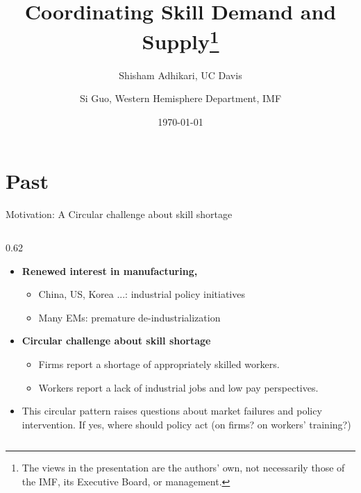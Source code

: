 \documentclass[9pt,xcolor={svgnames}]{beamer}
\title[Bridging the Manufacturing Gap]{\large \textbf{Coordinating Skill Demand and Supply\footnote{The views in the presentation are the authors' own, not necessarily those of the IMF, its Executive Board, or management.}\\ %
}
}
\author{Shisham Adhikari, UC Davis \\  %
\vspace{3mm}
\and Si Guo, Western Hemisphere Department,  IMF}    %
\date[Davis]{%
  \today
}
\begin{document}
\begin{frame}
\titlepage %
\end{frame}



\section{Past} 
\begin{frame}{Motivation: A Circular challenge about skill shortage}\label{main:intro}

\setlength{\columnsep}{8pt}

\begin{columns}[T,onlytextwidth]
\begin{column}{0.62\textwidth}
 \begin{itemize}

  \item \textbf{Renewed interest in  manufacturing,} 
    \begin{itemize}
        \item China, US, Korea ...: industrial policy initiatives
        \item Many EMs: premature de-industrialization
    \end{itemize}

\vspace{2mm}
 
    \item \textbf{Circular challenge about skill shortage} 
    \begin{itemize}
        \item Firms report a shortage of appropriately skilled workers. \hyperlink{app:media}{}

        \item Workers report a lack of industrial jobs and low pay perspectives. \hyperlink{app:jobshort}{}

    \end{itemize}
    
    \vspace{4mm}

    \item This circular pattern raises questions about market failures and policy intervention. If yes, where should policy act (on firms? on workers' training?)
    

\end{itemize}
\end{column}
\end{columns}
\end{frame}
\end{document}
